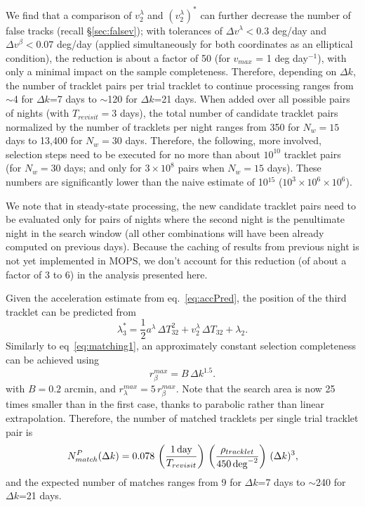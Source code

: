 We find that a comparison of $v_2^\lambda$ and $(v^\lambda_2)^\ast$ can further decrease
the number of false tracks (recall \S\ref{sec:falsev}); with tolerances of $\Delta v^\lambda < 0.3$ deg/day and
$\Delta v^\beta < 0.07$ deg/day (applied simultaneously for both coordinates as an
elliptical condition), the reduction is about a factor of 50 (for $v_{max}$ = 1 deg day$^{-1}$),
with only a minimal impact on the sample completeness. Therefore, depending on $\Delta k$, the number of tracklet
pairs per trial tracklet  to continue processing ranges from $\sim$4 for $\Delta k$=7 days to
$\sim$120 for $\Delta k$=21 days. When added over all possible pairs of nights (with
$T_{revisit}=3$ days), the total number of candidate tracklet pairs normalized by
the number of tracklets per night ranges from 350 for $N_w=15$ days to 13,400 for $N_w=30$ days.
Therefore, the following, more involved, selection steps need to be executed for
no more than about $10^{10}$ tracklet pairs (for $N_w=30$ days; and only for $3\times10^{8}$
pairs when $N_w=15$ days). These numbers are significantly lower than the naive estimate of
10$^{15}$ ($10^3\times10^6\times10^6$).

We note that in steady-state processing, the new candidate tracklet pairs need to
be evaluated only for pairs of nights where the second night is the penultimate
night in the search window (all other combinations will have been already computed
on previous days). Because the caching of results from previous night is not
yet implemented in MOPS, we don't account for this reduction (of about a factor of
3 to 6) in the analysis presented here.

Given the acceleration estimate from eq.~\ref{eq:accPred}, the position of the third
tracklet can be predicted from
\begin{equation}
\label{eq:lambdaPred3}
  \lambda_3^\ast = \frac{1}{2} a^\lambda \, \Delta T_{32}^2 + v_2^\lambda \, \Delta T_{32} + \lambda_2.
\end{equation}
Similarly to eq~\ref{eq:matching1}, an approximately constant selection completeness
can be achieved using
\begin{equation}
\label{eq:matching2}
                r_\beta^{max} = B \, \Delta k^{1.5}.
\end{equation}
with $B=0.2$ arcmin, and $r_\lambda^{max} = 5 \, r_\beta^{max}$. Note that the search
area is now 25 times smaller than in the first case, thanks to parabolic rather
than linear extrapolation. Therefore, the number of matched tracklets per single
trial tracklet pair is
\begin{equation}
\label{eq:Nmdk3}
     N^P_{match}(\Delta k) = 0.078 \, \left({1 \, {\rm day} \over T_{revisit}}\right) \,
                    \left( \rho_{tracklet}  \over 450 \, {\rm deg}^{-2} \right) \, (\Delta k)^3,
\end{equation}
and the expected number of matches ranges from 9 for $\Delta k$=7 days to
$\sim$240 for $\Delta k$=21 days.

